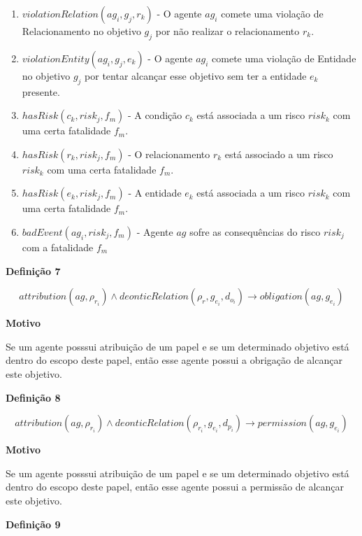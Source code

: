 \documentclass[12pt]{article}
\begin{document}
\begin{enumerate}
	\item $violationRelation(ag_i,g_j,r_k)$ - O agente $ag_i$ comete uma violação de Relacionamento no objetivo $g_j$ por não realizar o relacionamento $r_k$. 
	\item $violationEntity(ag_i,g_j,e_k)$ - O agente $ag_i$ comete uma violação de Entidade no objetivo $g_j$ por tentar alcançar esse objetivo sem ter a entidade $e_k$ presente.  	
	\item $hasRisk(c_k,risk_j,f_m)$ - A condição $c_k$ está associada a um risco $risk_k$ com uma certa fatalidade $f_m$. 
	\item $hasRisk(r_k,risk_j,f_m)$ - O relacionamento $r_k$ está associado a um risco $risk_k$ com uma certa fatalidade $f_m$.
	\item $hasRisk(e_k,risk_j,f_m)$ - A entidade $e_k$ está associada a um risco $risk_k$ com uma certa fatalidade $f_m$.
	\item $badEvent(ag_i,risk_j,f_m)$ - Agente $ag$ sofre as consequências do risco $risk_j$ com a fatalidade $f_m$
\end{enumerate}








\textbf{Definição 7}

\begin{equation}
	attribution(ag,\rho_{r_i})\wedge deonticRelation(\rho_{r},g_{e_i},d_{o_i}) \to obligation(ag,g_{e_i}) 
\end{equation}


\textbf{Motivo} 

Se um agente posssui atribuição de um papel e se um determinado objetivo está dentro do escopo deste papel, então esse agente possui a obrigação de alcançar este objetivo.



\textbf{Definição 8}

\begin{equation}
  attribution(ag,\rho_{r_i})\wedge deonticRelation(\rho_{r_i},g_{e_i},d_{p_i}) \to permission(ag,g_{e_i}) 
\end{equation}



\textbf{Motivo} 

Se um agente posssui atribuição de um papel e se um determinado objetivo está dentro do escopo deste papel, então esse agente possui a permissão de alcançar este objetivo.


\textbf{Definição 9}
\end{document}
